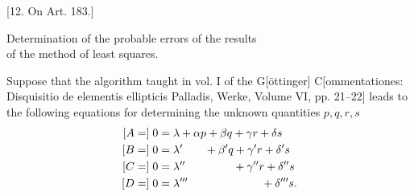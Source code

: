 \begin{center}
[12. On Art. 183.]
\end{center}
\begin{center}
Determination of the probable errors of the results\\
of the method of least squares.
\end{center}
Suppose that the algorithm taught in vol. I of the G[öttinger] C[ommenta\-tiones: Disquisitio de elementis ellipticis Palladis, Werke, Volume VI, pp. 21--22] leads to the following equations for determining the unknown quantities \(p,q,r,s\)
\[
\begin{aligned}
\relax[A=]\;0&=\lambda+\alpha p+\beta q+\gamma r+\delta s\\
[B=]\;0&=\lambda'\phantom{+\alpha p}+\beta'q+\gamma'r+\delta's\\
[C=]\;0&=\lambda''\phantom{+\alpha p+\beta q}+\gamma''r+\delta''s\\
[D=]\;0&=\lambda'''\phantom{+\alpha p+\beta q+\gamma r}+\delta'''s.
\end{aligned}
\]

